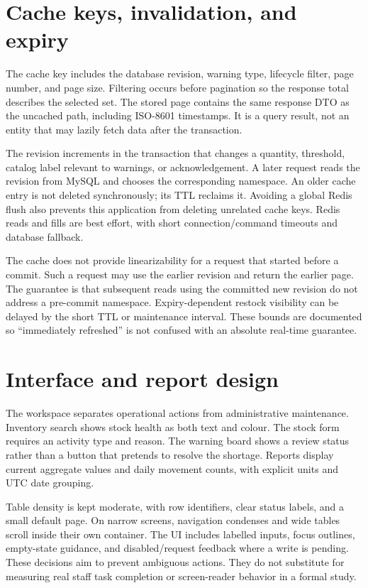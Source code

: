 \section{Cache keys, invalidation, and expiry}
The cache key includes the database revision, warning type, lifecycle filter, page number, and page size. Filtering occurs before pagination so the response total describes the selected set. The stored page contains the same response DTO as the uncached path, including ISO-8601 timestamps. It is a query result, not an entity that may lazily fetch data after the transaction.

The revision increments in the transaction that changes a quantity, threshold, catalog label relevant to warnings, or acknowledgement. A later request reads the revision from MySQL and chooses the corresponding namespace. An older cache entry is not deleted synchronously; its TTL reclaims it. Avoiding a global Redis flush also prevents this application from deleting unrelated cache keys. Redis reads and fills are best effort, with short connection/command timeouts and database fallback.

The cache does not provide linearizability for a request that started before a commit. Such a request may use the earlier revision and return the earlier page. The guarantee is that subsequent reads using the committed new revision do not address a pre-commit namespace. Expiry-dependent restock visibility can be delayed by the short TTL or maintenance interval. These bounds are documented so ``immediately refreshed'' is not confused with an absolute real-time guarantee.

\section{Interface and report design}
The workspace separates operational actions from administrative maintenance. Inventory search shows stock health as both text and colour. The stock form requires an activity type and reason. The warning board shows a review status rather than a button that pretends to resolve the shortage. Reports display current aggregate values and daily movement counts, with explicit units and UTC date grouping.

Table density is kept moderate, with row identifiers, clear status labels, and a small default page. On narrow screens, navigation condenses and wide tables scroll inside their own container. The UI includes labelled inputs, focus outlines, empty-state guidance, and disabled/request feedback where a write is pending. These decisions aim to prevent ambiguous actions. They do not substitute for measuring real staff task completion or screen-reader behavior in a formal study.
